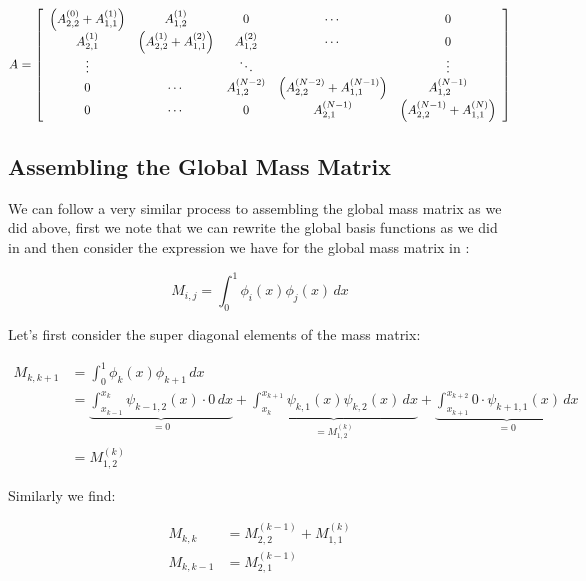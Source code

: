\begin{equation}\label{eq:oned-deterministic-global-stiffness}
    A = \left[\begin{array}{c c c c c}
         \left(A^{(0)}_{2,2} + A^{(1)}_{1,1}\right) & A^{(1)}_{1,2} & 0 & \cdots & 0 \\
         A^{(1)}_{2,1} & \left(A^{(1)}_{2,2} + A^{(2)}_{1,1}\right) & A^{(2)}_{1,2} & \cdots & 0 \\
         \vdots & & \ddots  & & \vdots \\
         0 & \cdots & A^{(N-2)}_{1,2} & \left(A^{(N-2)}_{2,2} + A^{(N-1)}_{1,1}\right)& A^{(N-1)}_{1,2} \\
         0 & \cdots & 0 & A^{(N-1)}_{2,1} & \left(A^{(N-1)}_{2,2} + A^{(N)}_{1,1}\right)
        \end{array}\right]
\end{equation}

\subsection{Assembling the Global Mass
Matrix}\label{sec:oned-deterministic-global-mass-assembly}

We can follow a very similar process to assembling the global mass matrix as we
did above, first we note that we can rewrite the global basis functions as we
did in  and then consider the
expression we have for the global mass matrix in
:

\[
    M_{i,j} = \int_0^1\phi_i(x)\phi_j(x)\, dx
\]

Let's first consider the super diagonal elements of the mass matrix:

\begin{align*}
    M_{k,k+1} &= \int_0^1\phi_k(x)\phi_{k+1}\, dx \\
              &= \underbrace{\int_{x_{k-1}}^{x_k}\psi_{k-1,2}(x) \cdot 0\, dx}_{ = 0}
               + \underbrace{\int_{x_k}^{x_{k+1}}\psi_{k,1}(x)\psi_{k,2}(x)\, dx}_{= M^{(k)}_{1,2}}
               + \underbrace{\int_{x_{k+1}}^{x_{k+2}}0 \cdot \psi_{k+1,1}(x)\, dx}_{= 0} \\
              &= M^{(k)}_{1,2}
\end{align*}

Similarly we find:

\begin{align*}
    M_{k,k} &= M^{(k-1)}_{2,2} + M^{(k)}_{1,1} \\
    M_{k,k-1} &= M^{(k-1)}_{2,1}
\end{align*}

